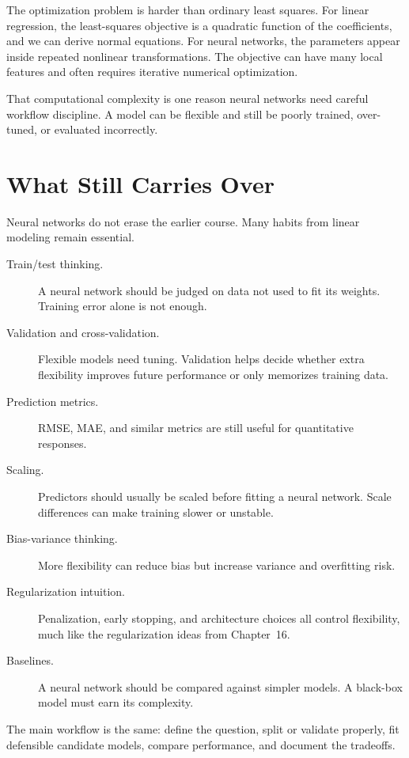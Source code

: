 The optimization problem is harder than ordinary least squares.  For linear regression, the least-squares objective is a quadratic function of the coefficients, and we can derive normal equations.  For neural networks, the parameters appear inside repeated nonlinear transformations.  The objective can have many local features and often requires iterative numerical optimization.

That computational complexity is one reason neural networks need careful workflow discipline.  A model can be flexible and still be poorly trained, over-tuned, or evaluated incorrectly.

\section{What Still Carries Over}

Neural networks do not erase the earlier course.  Many habits from linear modeling remain essential.

\begin{description}
  \item[Train/test thinking.] A neural network should be judged on data not used to fit its weights.  Training error alone is not enough.
  \item[Validation and cross-validation.] Flexible models need tuning.  Validation helps decide whether extra flexibility improves future performance or only memorizes training data.
  \item[Prediction metrics.] RMSE, MAE, and similar metrics are still useful for quantitative responses.
  \item[Scaling.] Predictors should usually be scaled before fitting a neural network.  Scale differences can make training slower or unstable.
  \item[Bias-variance thinking.] More flexibility can reduce bias but increase variance and overfitting risk.
  \item[Regularization intuition.] Penalization, early stopping, and architecture choices all control flexibility, much like the regularization ideas from Chapter~16.
  \item[Baselines.] A neural network should be compared against simpler models.  A black-box model must earn its complexity.
\end{description}

The main workflow is the same: define the question, split or validate properly, fit defensible candidate models, compare performance, and document the tradeoffs.

